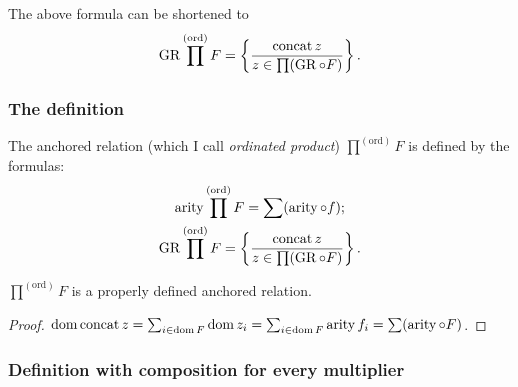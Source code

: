 The above formula can be shortened to
\[
\operatorname{GR}\prod^{\mathrm{(ord)}}F=\left\{ \frac{\operatorname{concat} z}{z\in\prod(\operatorname{GR}\circ F)}\right\}.
\]



\subsubsection{The definition}
\begin{defn}
The anchored relation (which I call \emph{ordinated
product}) $\prod^{\mathrm{(ord)}}F$ is defined by the formulas:
\begin{gather*}
\operatorname{arity}\prod^{\mathrm{(ord)}}F=\sum(\operatorname{arity}\circ f);\\
\operatorname{GR}\prod^{\mathrm{(ord)}}F=\left\{ \frac{\operatorname{concat} z}{z\in\prod(\operatorname{GR}\circ F)}\right\}.
\end{gather*}
\end{defn}
\begin{prop}
$\prod^{\mathrm{(ord)}}F$ is a properly defined anchored relation.\end{prop}
\begin{proof}
$\operatorname{dom}\operatorname{concat} z=\sum_{i\in\operatorname{dom} F}\operatorname{dom} z_{i}=\sum_{i\in\operatorname{dom} F}\operatorname{arity} f_{i}=\sum(\operatorname{arity}\circ F)$.
\end{proof}

\subsubsection{Definition with composition for every multiplier}

